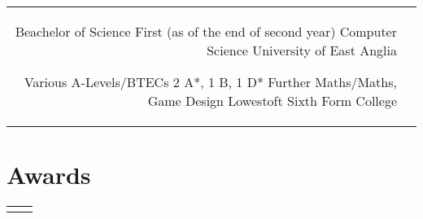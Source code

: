 \documentclass[10pt]{article} %
\begin{document}
\begin{paracol}{2}
\begin{supertabular}{rl}
	
	{Beachelor of Science} %
	{First (as of the end of second year)} %
	{Computer Science} %
	{University of East Anglia} %
	
	
	{Various A-Levels/BTECs} %
	{2 A*, 1 B, 1 D*} %
	{Further Maths/Maths, Game Design} %
	{Lowestoft Sixth Form College} %
	

\end{supertabular}


\section{Awards}





\begin{supertabular}{rl} %
	
	
	
	
\end{supertabular}



\end{paracol}
\end{document}
